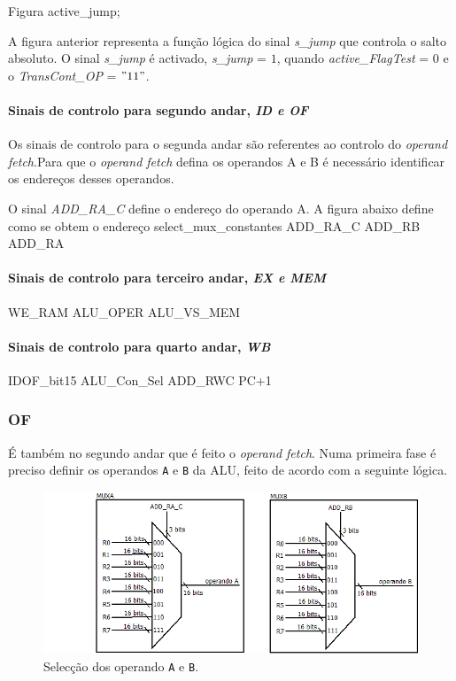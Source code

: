 \documentclass[11pt]{article}
\numberwithin{equation}{section}
\begin{document}
 	Figura active\_jump;
 	
 	A figura anterior representa a função lógica do sinal \textit{s\_jump} que controla o salto absoluto. O sinal \textit{s\_jump} é activado, \textit{s\_jump} = $1$, quando \textit{active\_FlagTest} = $0$ e o \textit{TransCont\_OP} = $"11"$.
 	
 	
\paragraph{Sinais de controlo para segundo andar, \textit{ID e OF}}

Os sinais de controlo para o segunda andar são referentes ao controlo do \textit{operand fetch}.Para que o \textit{operand fetch} defina os operandos A e B é necessário identificar os endereços desses operandos.

	O sinal \textit{ADD\_RA\_C} define o endereço do operando A. A figura abaixo define como se obtem o endereço
 select\_mux\_constantes ADD\_RA\_C ADD\_RB ADD\_RA

\paragraph{Sinais de controlo para terceiro andar, \textit{EX e MEM}}
WE\_RAM ALU\_OPER ALU\_VS\_MEM 
\paragraph{Sinais de controlo para quarto andar, \textit{WB}}
	IDOF\_bit15 ALU\_Con\_Sel ADD\_RWC PC+1







\subsubsection{OF}

É também no segundo andar que é feito o \textit{operand fetch}. Numa primeira fase é preciso definir os operandos \texttt{A} e \texttt{B} da ALU, feito de acordo com a seguinte lógica.

\begin{figure}[H]
	\centering
	\includegraphics[keepaspectratio=true, scale=0.35]{imagens/OF1}
	\caption{Selecção dos operando \texttt{A} e \texttt{B}.}
	\vspace{-0.8em}
\end{figure}
\end{document}
